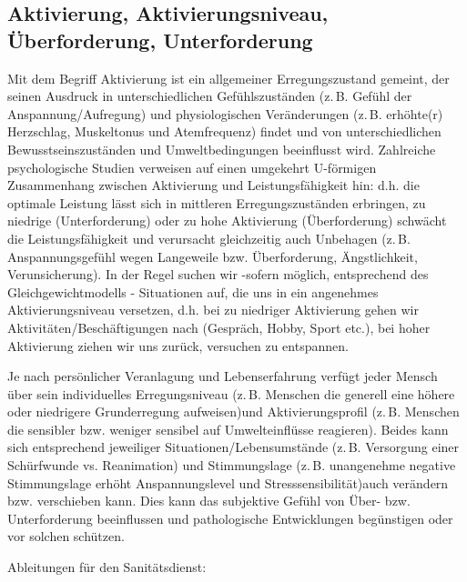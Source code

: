 \subsection{Aktivierung, Aktivierungsniveau, Überforderung, Unterforderung}

\label{topic:ueberforderung-psi}
\label{topic:unterforderung-psi}


Mit dem Begriff Aktivierung ist ein allgemeiner Erregungszustand gemeint, der seinen Ausdruck in unterschiedlichen Gefühlszuständen (z.\,B. Gefühl der Anspannung/Aufregung) und physiologischen Veränderungen (z.\,B. erhöhte(r) Herzschlag, Muskeltonus und Atemfrequenz) findet und von unterschiedlichen Bewusstseinszuständen und Umweltbedingungen beeinflusst wird. Zahlreiche psychologische Studien verweisen auf einen umgekehrt U-förmigen Zusammenhang zwischen Aktivierung und Leistungsfähigkeit hin: d.h. die optimale Leistung lässt sich in mittleren Erregungszuständen erbringen, zu niedrige (Unterforderung) oder zu hohe Aktivierung (Überforderung) schwächt die Leistungsfähigkeit und verursacht gleichzeitig auch Unbehagen (z.\,B. Anspannungsgefühl wegen Langeweile bzw. Überforderung, Ängstlichkeit, Verunsicherung). In der Regel suchen wir -sofern möglich, entsprechend des Gleichgewichtmodells - Situationen auf, die uns in ein angenehmes Aktivierungsniveau versetzen, d.h. bei zu niedriger Aktivierung gehen wir Aktivitäten/Beschäftigungen nach (Gespräch, Hobby, Sport etc.), bei hoher Aktivierung ziehen wir uns zurück, versuchen zu entspannen.

Je nach persönlicher Veranlagung und Lebenserfahrung verfügt jeder Mensch über sein individuelles Erregungsniveau (z.\,B. Menschen die generell eine höhere oder niedrigere Grunderregung aufweisen)und Aktivierungsprofil (z.\,B. Menschen die sensibler bzw. weniger sensibel auf Umwelteinflüsse reagieren). Beides kann sich entsprechend jeweiliger Situationen/Lebensumstände (z.\,B. Versorgung einer Schürfwunde vs. Reanimation)   und
Stimmungslage (z.\,B. unangenehme negative Stimmungslage erhöht Anspannungslevel und Stresssensibilität)auch verändern bzw. verschieben kann. Dies kann das subjektive Gefühl von Über- bzw. Unterforderung beeinflussen und pathologische Entwicklungen begünstigen oder vor solchen schützen.



Ableitungen für den Sanitätsdienst: 

